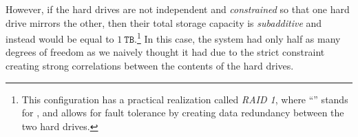 However, if the hard drives are not independent and \emph{constrained} so that one hard drive mirrors the other, then their total storage capacity is \emph{subadditive} and instead would be equal to $1~\texttt{TB}$.\footnote{
    This configuration has a practical realization called \emph{RAID 1}, where ``'' stands for , and allows for fault tolerance by creating data redundancy between the two hard drives.
}
In this case, the system had only half as many degrees of freedom as we naively thought it had due to the strict constraint creating strong correlations between the contents of the hard drives.









